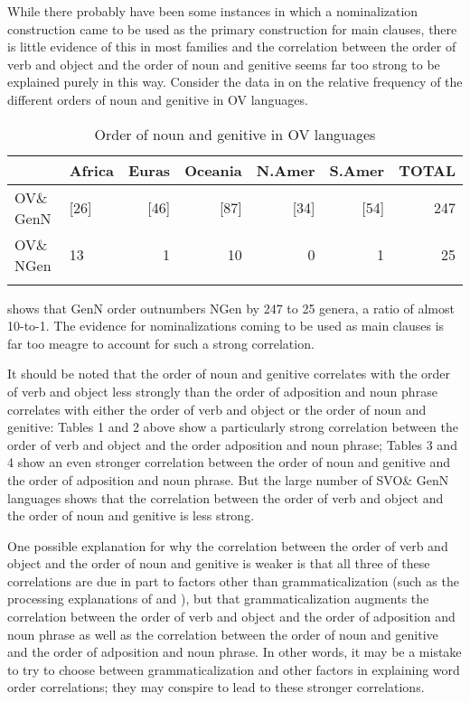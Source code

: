 \documentclass[output=paper]{langsci/langscibook}
\begin{document}
While there probably have been some instances in which a nominalization construction came to be used as the primary construction for main clauses, there is little evidence of this in most families and the correlation between the order of verb and object and the order of noun and genitive seems far too strong to be explained purely in this way. Consider the data in  on the relative frequency of the different orders of noun and genitive in OV languages.

\begin{table}
\begin{tabularx}{\textwidth}{Xlrrrrr}
\lsptoprule
& \bfseries Africa & \bfseries Euras & \bfseries Oceania & \bfseries N.Amer & \bfseries S.Amer & \bfseries TOTAL\\
\midrule
OV\& GenN & [26] & [46] & [87] & [34] & [54] & 247\\
OV\& NGen & 13 & 1 & 10 & 0 & 1 & 25\\
\lspbottomrule
\end{tabularx}
\caption{\label{tab:dryer:7}Order of noun and genitive in OV languages}
\end{table}

 shows that GenN order outnumbers NGen by 247 to 25 genera, a ratio of almost 10-to-1. The evidence for nominalizations coming to be used as main clauses is far too meagre to account for such a strong correlation.

It should be noted that the order of noun and genitive correlates with the order of verb and object less strongly than the order of adposition and noun phrase correlates with either the order of verb and object or the order of noun and genitive: Tables 1 and 2 above show a particularly strong correlation between the order of verb and object and the order adposition and noun phrase; Tables 3 and 4 show an even stronger correlation between the order of noun and genitive and the order of adposition and noun phrase. But the large number of SVO\& GenN languages shows that the correlation between the order of verb and object and the order of noun and genitive is less strong.

One possible explanation for why the correlation between the order of verb and object and the order of noun and genitive is weaker is that all three of these correlations are due in part to factors other than grammaticalization (such as the processing explanations of \citealt{Dryer1992} and \citealt{Hawkins1994,Hawkins2004,Hawkins2014}), but that grammaticalization augments the correlation between the order of verb and object and the order of adposition and noun phrase as well as the correlation between the order of noun and genitive and the order of adposition and noun phrase. In other words, it may be a mistake to try to choose between grammaticalization and other factors in explaining word order correlations; they may conspire to lead to these stronger correlations.
\end{document}
